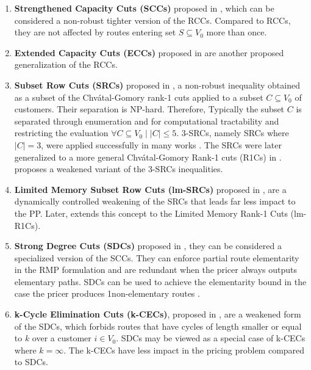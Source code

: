 \begin{enumerate}
	\setlength{\itemsep}{0pt}
	\setlength{\parskip}{0pt}

	\item \textbf{Strengthened Capacity Cuts (SCCs)} proposed in \textcite{baldacci2008},
	      which can be considered a non-robust tighter version of the RCCs.
	      Compared to RCCs, they are not affected by routes entering set $S \subseteq V_0$ more than once.
	\item \textbf{Extended Capacity Cuts (ECCs)} proposed in \textcite{pessoa2008, pessoa2009}
	      are another proposed generalization of the RCCs.
	\item \textbf{Subset Row Cuts (SRCs)} proposed in \textcite{jepsen2008a}, a non-robust
	      inequality obtained as a subset of the  Chv\'atal-Gomory rank-1 cuts \parencite{chvatal1973}
	      applied to a subset $C \subseteq V_0$ of customers.
	      Their separation is NP-hard.
	      Therefore, Typically the subset $C$ is separated through enumeration
	      and for computational tractability and restricting the evaluation $\forall C \subseteq V_0 \mid |C| \le 5$.
	      3-SRCs, namely SRCs where $|C| = 3$, were applied successfully in many works \parencite{desaulniers2008, jepsen2008, baldacci2011, contardo2014, pecin2017}.
	      The SRCs were later generalized to a more general Chv\'atal-Gomory Rank-1 cuts (R1Cs) in \textcite{petersen2008}.
	      \textcite{baldacci2011} proposes a weakened variant of the 3-SRCs inequalities.
	\item \textbf{Limited Memory Subset Row Cuts (lm-SRCs)} proposed in \textcite{pecin2017},
	      are a dynamically controlled weakening of the SRCs that leads far less impact to
	      the PP.
	      Later, \textcite{pecin2017a} extends this concept to the Limited Memory Rank-1 Cuts (lm-R1Cs).
	\item \textbf{Strong Degree Cuts (SDCs)} proposed in \textcite{contardo2011, contardo2014}, they can be considered
	      a specialized version of the SCCs.
	      They can enforce partial route elementarity in the RMP formulation
	      and are redundant when the pricer always outputs elementary paths.
	      SDCs can be used to achieve the elementarity bound in the case
	      the pricer produces 1non-elementary routes \parencite{contardo2014}.
	\item \textbf{k-Cycle Elimination Cuts (k-CECs)}, proposed in \textcite{contardo2014},
	      are a weakened form of the SDCs, which forbids
	      routes that have cycles of length smaller or equal to $k$ over a customer $i \in V_0$.
	      SDCs may be viewed as a special case of k-CECs where $k = \infty$.
	      The k-CECs have less impact in the pricing problem compared to SDCs.
\end{enumerate}


